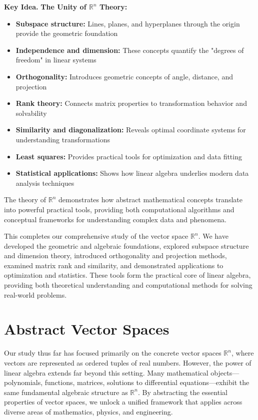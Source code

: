 \documentclass[12pt]{article}
\numberwithin{equation}{section}
\theoremstyle{plain}
\theoremstyle{definition}
\theoremstyle{remark}
\newenvironment{keyidea}{\begin{tcolorbox}\textbf{Key Idea.}}{\end{tcolorbox}}
\begin{document}
\begin{keyidea}
\textbf{The Unity of $\mathbb{R}^n$ Theory:}
\begin{itemize}
\item \textbf{Subspace structure:} Lines, planes, and hyperplanes through the origin provide the geometric foundation
\item \textbf{Independence and dimension:} These concepts quantify the "degrees of freedom" in linear systems
\item \textbf{Orthogonality:} Introduces geometric concepts of angle, distance, and projection
\item \textbf{Rank theory:} Connects matrix properties to transformation behavior and solvability
\item \textbf{Similarity and diagonalization:} Reveals optimal coordinate systems for understanding transformations
\item \textbf{Least squares:} Provides practical tools for optimization and data fitting
\item \textbf{Statistical applications:} Shows how linear algebra underlies modern data analysis techniques
\end{itemize}

The theory of $\mathbb{R}^n$ demonstrates how abstract mathematical concepts translate into powerful practical tools, providing both computational algorithms and conceptual frameworks for understanding complex data and phenomena.
\end{keyidea}

This completes our comprehensive study of the vector space $\mathbb{R}^n$. We have developed the geometric and algebraic foundations, explored subspace structure and dimension theory, introduced orthogonality and projection methods, examined matrix rank and similarity, and demonstrated applications to optimization and statistics. These tools form the practical core of linear algebra, providing both theoretical understanding and computational methods for solving real-world problems.

\newpage
\section{Abstract Vector Spaces}

Our study thus far has focused primarily on the concrete vector spaces $\mathbb{R}^n$, where vectors are represented as ordered tuples of real numbers. However, the power of linear algebra extends far beyond this setting. Many mathematical objects—polynomials, functions, matrices, solutions to differential equations—exhibit the same fundamental algebraic structure as $\mathbb{R}^n$. By abstracting the essential properties of vector spaces, we unlock a unified framework that applies across diverse areas of mathematics, physics, and engineering.
\end{document}
